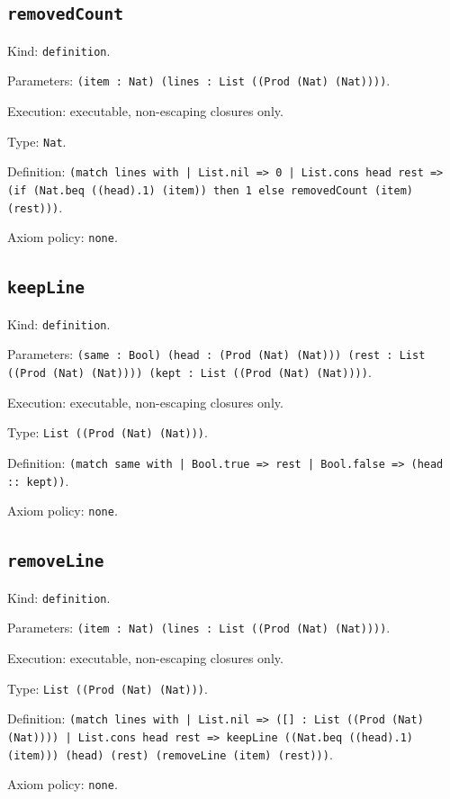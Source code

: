 \documentclass[11pt]{article}
\begin{document}
\subsection*{\texttt{removedCount}}
\noindent Kind: \texttt{definition}.\par
\noindent Parameters: \texttt{(item : Nat) (lines : List ((Prod (Nat) (Nat))))}.\par
\noindent Execution: executable, non-escaping closures only.\par
\noindent Type: \texttt{Nat}.\par
\noindent Definition: \texttt{(match lines with | List.nil => 0 | List.cons head rest => (if (Nat.beq ((head).1) (item)) then 1 else removedCount (item) (rest)))}.\par
\noindent Axiom policy: \texttt{none}.\par
\subsection*{\texttt{keepLine}}
\noindent Kind: \texttt{definition}.\par
\noindent Parameters: \texttt{(same : Bool) (head : (Prod (Nat) (Nat))) (rest : List ((Prod (Nat) (Nat)))) (kept : List ((Prod (Nat) (Nat))))}.\par
\noindent Execution: executable, non-escaping closures only.\par
\noindent Type: \texttt{List ((Prod (Nat) (Nat)))}.\par
\noindent Definition: \texttt{(match same with | Bool.true => rest | Bool.false => (head :: kept))}.\par
\noindent Axiom policy: \texttt{none}.\par
\subsection*{\texttt{removeLine}}
\noindent Kind: \texttt{definition}.\par
\noindent Parameters: \texttt{(item : Nat) (lines : List ((Prod (Nat) (Nat))))}.\par
\noindent Execution: executable, non-escaping closures only.\par
\noindent Type: \texttt{List ((Prod (Nat) (Nat)))}.\par
\noindent Definition: \texttt{(match lines with | List.nil => ([] : List ((Prod (Nat) (Nat)))) | List.cons head rest => keepLine ((Nat.beq ((head).1) (item))) (head) (rest) (removeLine (item) (rest)))}.\par
\noindent Axiom policy: \texttt{none}.\par
\end{document}
